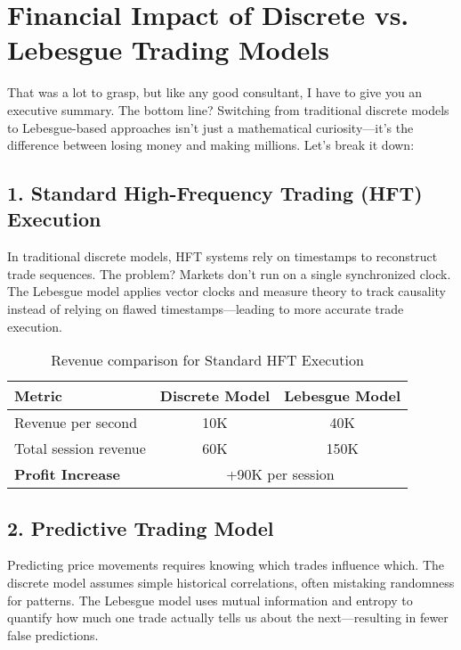 \section{Financial Impact of Discrete vs. Lebesgue Trading Models}

\noindent That was a lot to grasp, but like any good consultant, I have to give you an executive summary. The bottom line? Switching from traditional discrete models to Lebesgue-based approaches isn’t just a mathematical curiosity—it’s the difference between losing money and making millions. Let’s break it down:

\subsection{1. Standard High-Frequency Trading (HFT) Execution}

\noindent In traditional discrete models, HFT systems rely on timestamps to reconstruct trade sequences. The problem? Markets don’t run on a single synchronized clock. The Lebesgue model applies vector clocks and measure theory to track causality instead of relying on flawed timestamps—leading to more accurate trade execution.

\begin{table}[h]
    \centering
    \small
    \renewcommand{\arraystretch}{1.2}
    \begin{tabular}{lcc}
        \toprule
        \textbf{Metric} & \textbf{Discrete Model} & \textbf{Lebesgue Model} \\
        \midrule
        Revenue per second & 10K & 40K \\
        Total session revenue & 60K & 150K \\
        \textbf{Profit Increase} & \multicolumn{2}{c}{+90K per session} \\
        \bottomrule
    \end{tabular}
    \caption{Revenue comparison for Standard HFT Execution}
\end{table}

\subsection{2. Predictive Trading Model}

\noindent Predicting price movements requires knowing which trades influence which. The discrete model assumes simple historical correlations, often mistaking randomness for patterns. The Lebesgue model uses mutual information and entropy to quantify how much one trade actually tells us about the next—resulting in fewer false predictions.

